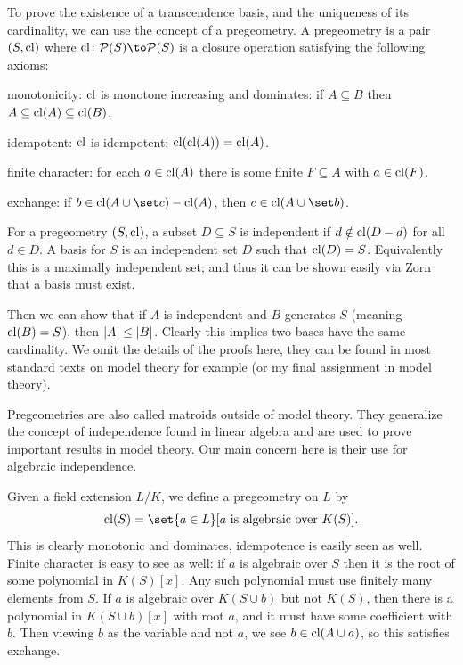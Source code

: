 \edefn

\bnote

    To prove the existence of a transcendence basis, and the uniqueness of its cardinality, we can use the concept of a {\emphcolor pregeometry}.
    A {\emphcolor pregeometry} is a pair $(S,{\rm cl})$ where $\cll\colon\P(S)\to\P(S)$ is a {\emphcolor closure operation} satisfying the following axioms:
    \benum
        \item {\emphcolor monotonicity}: ${\rm cl}$ is monotone increasing and dominates: if $A\subseteq B$ then $A\subseteq{\rm cl}(A)\subseteq{\rm cl}(B)$.
        \item {\emphcolor idempotent}: ${\rm cl}$ is idempotent: ${\rm cl}({\rm cl}(A))={\rm cl}(A)$.
        \item {\emphcolor finite character}: for each $a\in{\rm cl}(A)$ there is some finite $F\subseteq A$ with $a\in{\rm cl}(F)$.
        \item {\emphcolor exchange}: if $b\in\cll(A\cup\set c)-\cll(A)$, then $c\in\cll(A\cup\set b)$.
    \eenum

    For a pregeometry $(S,{\rm cl})$, a subset $D\subseteq S$ is {\emphcolor independent} if $d\notin{\rm cl}(D-d)$ for all $d\in D$.
    A {\emphcolor basis} for $S$ is an independent set $D$ such that ${\rm cl}(D)=S$.
    Equivalently this is a maximally independent set; and thus it can be shown easily via Zorn that a basis must exist.

    Then we can show that if $A$ is independent and $B$ generates $S$ (meaning ${\rm cl}(B)=S$), then $\mathopen{}\mathclose{\left|A\right|}\leq\mathopen{}\mathclose{\left|B\right|}$.
    Clearly this implies two bases have the same cardinality.
    We omit the details of the proofs here, they can be found in most standard texts on model theory for example (or my final assignment in model theory).

    Pregeometries are also called {\emphcolor matroids} outside of model theory.
    They generalize the concept of independence found in linear algebra and are used to prove important results in model theory.
    Our main concern here is their use for algebraic independence.

    Given a field extension $L/K$, we define a pregeometry on $L$ by
    $$ \cll(S) = \set{a\in L}[\hbox{$a$ is algebraic over $K(S)$}] . $$
    This is clearly monotonic and dominates, idempotence is easily seen as well.
    Finite character is easy to see as well: if $a$ is algebraic over $S$ then it is the root of some polynomial in $K(S)[x]$.
    Any such polynomial must use finitely many elements from $S$.
    If $a$ is algebraic over $K(S\cup b)$ but not $K(S)$, then there is a polynomial in $K(S\cup b)[x]$ with root $a$, and it must have some coefficient with $b$.
    Then viewing $b$ as the variable and not $a$, we see $b\in{\rm cl}(A\cup a)$, so this satisfies exchange.

